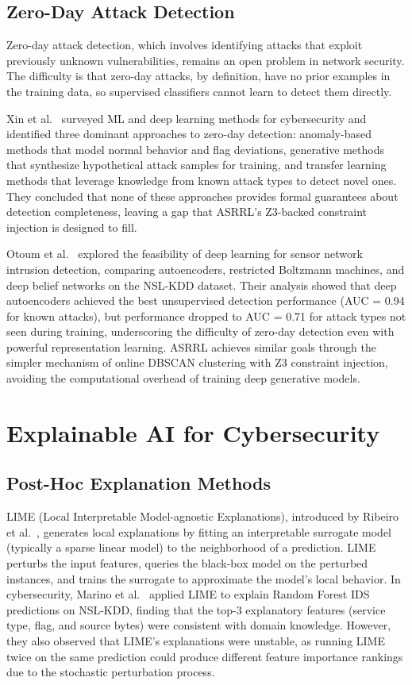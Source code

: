 \documentclass[12pt, letterpaper, oneside]{report}
\newcommand{\ASRRL}{\textsc{ASRRL}}
\begin{document}
\subsection{Zero-Day Attack Detection}

Zero-day attack detection, which involves identifying attacks that exploit previously unknown vulnerabilities, remains an open problem in network security. The difficulty is that zero-day attacks, by definition, have no prior examples in the training data, so supervised classifiers cannot learn to detect them directly.

Xin et al.~\citep{xin2018} surveyed ML and deep learning methods for cybersecurity and identified three dominant approaches to zero-day detection: anomaly-based methods that model normal behavior and flag deviations, generative methods that synthesize hypothetical attack samples for training, and transfer learning methods that leverage knowledge from known attack types to detect novel ones. They concluded that none of these approaches provides formal guarantees about detection completeness, leaving a gap that \ASRRL{}'s Z3-backed constraint injection is designed to fill.

Otoum et al.~\citep{otoum2019} explored the feasibility of deep learning for sensor network intrusion detection, comparing autoencoders, restricted Boltzmann machines, and deep belief networks on the NSL-KDD dataset. Their analysis showed that deep autoencoders achieved the best unsupervised detection performance (AUC = 0.94 for known attacks), but performance dropped to AUC = 0.71 for attack types not seen during training, underscoring the difficulty of zero-day detection even with powerful representation learning. \ASRRL{} achieves similar goals through the simpler mechanism of online DBSCAN clustering with Z3 constraint injection, avoiding the computational overhead of training deep generative models.


\section{Explainable AI for Cybersecurity}
\label{sec:lit_xai}

\subsection{Post-Hoc Explanation Methods}

LIME (Local Interpretable Model-agnostic Explanations), introduced by Ribeiro et al.~\citep{ribeiro2016}, generates local explanations by fitting an interpretable surrogate model (typically a sparse linear model) to the neighborhood of a prediction. LIME perturbs the input features, queries the black-box model on the perturbed instances, and trains the surrogate to approximate the model's local behavior. In cybersecurity, Marino et al.~\citep{marino2018} applied LIME to explain Random Forest IDS predictions on NSL-KDD, finding that the top-3 explanatory features (service type, flag, and source bytes) were consistent with domain knowledge. However, they also observed that LIME's explanations were unstable, as running LIME twice on the same prediction could produce different feature importance rankings due to the stochastic perturbation process.
\end{document}
